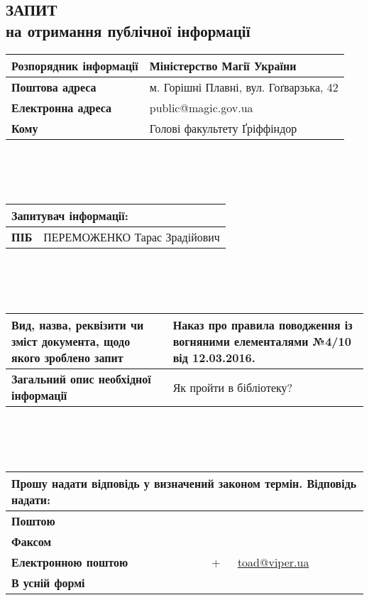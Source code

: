\documentclass[a4paper,12pt]{article}
\newcommand\email[1]{\href{mailto:#1}{#1}}
\begin{document}
  \thispagestyle{empty}
  \subsection*{\centering ЗАПИТ\\на отримання публічної інформації}

  \begin{tabular}{| p{} | p{} |}
    \hline
    \textbf{Розпорядник інформації} & Міністерство Магії України \\
    \hline
    \textbf{Поштова адреса} & м. Горішні Плавні, вул. Гоґварзька, 42 \\
    \hline
    \textbf{Електронна адреса} & public@magic.gov.ua \\
    \hline
    \textbf{Кому} & Голові факультету Ґріффіндор\\
    \hline
  \end{tabular}\\\\\\
  \begin{tabular}{| p{} | p{} |}
    \hline
    \multicolumn{2}{|l|}{\textbf{Запитувач інформації:}} \\
    \hline
    \textbf{ПІБ} & ПЕРЕМОЖЕНКО Тарас Зрадійович \\
    \hline
  \end{tabular}\\\\\\
  \begin{tabular}{| p{} | p{} |}
    \hline
    \textbf{Вид, назва, реквізити чи зміст документа, щодо якого зроблено запит} & Наказ про правила поводження із вогняними елементалями №4/10 від 12.03.2016. \\
    \hline
    \textbf{Загальний опис необхідної інформації} & Як пройти в бібліотеку? \\
    \hline
  \end{tabular}\\\\\\
  \begin{tabular}{| p{} | c | p{} |}
    \hline
    \multicolumn{3}{|l|}{\textbf{Прошу надати відповідь у визначений законом термін. Відповідь надати:}} \\
    \hline
    \textbf{Поштою} & & \\
    \hline
    \textbf{Факсом} & & \\
    \hline
    \textbf{Електронною поштою} & + & \email{toad@viper.ua} \\
    \hline
    \textbf{В усній формі} & & \\
    \hline
  \end{tabular}\\\\\\
\end{document}
